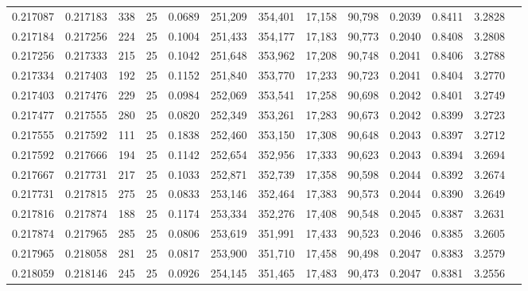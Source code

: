 \begin{tabular}{rrrrrrrrrrrrr}
0.217087 & 0.217183 &   338 &  25 &                                     0.0689 & 251,209 & 354,401 &  17,158 &  90,798 & 0.2039 & 0.8411 & 3.2828 \\
0.217184 & 0.217256 &   224 &  25 &                                     0.1004 & 251,433 & 354,177 &  17,183 &  90,773 & 0.2040 & 0.8408 & 3.2808 \\
0.217256 & 0.217333 &   215 &  25 &                                     0.1042 & 251,648 & 353,962 &  17,208 &  90,748 & 0.2041 & 0.8406 & 3.2788 \\
0.217334 & 0.217403 &   192 &  25 &                                     0.1152 & 251,840 & 353,770 &  17,233 &  90,723 & 0.2041 & 0.8404 & 3.2770 \\
0.217403 & 0.217476 &   229 &  25 &                                     0.0984 & 252,069 & 353,541 &  17,258 &  90,698 & 0.2042 & 0.8401 & 3.2749 \\
0.217477 & 0.217555 &   280 &  25 &                                     0.0820 & 252,349 & 353,261 &  17,283 &  90,673 & 0.2042 & 0.8399 & 3.2723 \\
0.217555 & 0.217592 &   111 &  25 &                                     0.1838 & 252,460 & 353,150 &  17,308 &  90,648 & 0.2043 & 0.8397 & 3.2712 \\
0.217592 & 0.217666 &   194 &  25 &                                     0.1142 & 252,654 & 352,956 &  17,333 &  90,623 & 0.2043 & 0.8394 & 3.2694 \\
0.217667 & 0.217731 &   217 &  25 &                                     0.1033 & 252,871 & 352,739 &  17,358 &  90,598 & 0.2044 & 0.8392 & 3.2674 \\
0.217731 & 0.217815 &   275 &  25 &                                     0.0833 & 253,146 & 352,464 &  17,383 &  90,573 & 0.2044 & 0.8390 & 3.2649 \\
0.217816 & 0.217874 &   188 &  25 &                                     0.1174 & 253,334 & 352,276 &  17,408 &  90,548 & 0.2045 & 0.8387 & 3.2631 \\
0.217874 & 0.217965 &   285 &  25 &                                     0.0806 & 253,619 & 351,991 &  17,433 &  90,523 & 0.2046 & 0.8385 & 3.2605 \\
0.217965 & 0.218058 &   281 &  25 &                                     0.0817 & 253,900 & 351,710 &  17,458 &  90,498 & 0.2047 & 0.8383 & 3.2579 \\
0.218059 & 0.218146 &   245 &  25 &                                     0.0926 & 254,145 & 351,465 &  17,483 &  90,473 & 0.2047 & 0.8381 & 3.2556 \\

\end{tabular}

